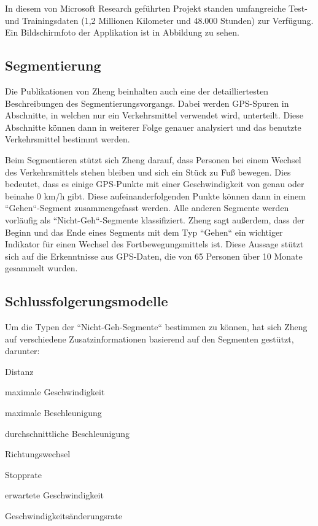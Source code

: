 In diesem von Microsoft Research geführten Projekt standen umfangreiche Test- und Trainingsdaten (1,2 Millionen Kilometer und 48.000 Stunden) zur Verfügung. \cite{microsoft_research_geolife_2015} Ein Bildschirmfoto der Applikation ist in Abbildung  zu sehen. 


\subsection{Segmentierung}
Die Publikationen von Zheng beinhalten auch eine der detailliertesten Beschreibungen des Segmentierungsvorgangs. Dabei werden GPS-Spuren in Abschnitte, in welchen nur ein Verkehrsmittel verwendet wird, unterteilt. Diese Abschnitte können dann in weiterer Folge genauer analysiert und das benutzte Verkehrsmittel bestimmt werden.

Beim Segmentieren stützt sich Zheng darauf, dass Personen bei einem Wechsel des Verkehrsmittels stehen bleiben und sich ein Stück zu Fuß bewegen. Dies bedeutet, dass es einige GPS-Punkte mit einer Geschwindigkeit von genau oder beinahe 0 km/h gibt. Diese aufeinanderfolgenden Punkte können dann in einem ``Gehen``-Segment zusammengefasst werden. Alle anderen Segmente werden vorläufig als ``Nicht-Geh``-Segmente klassifiziert. Zheng sagt außerdem, dass der Beginn und das Ende eines Segments mit dem Typ ``Gehen`` ein wichtiger Indikator für einen Wechsel des Fortbewegungsmittels ist. Diese Aussage stützt sich auf die Erkenntnisse aus GPS-Daten, die von 65 Personen über 10 Monate gesammelt wurden.

\subsection{Schlussfolgerungsmodelle} \label{schlussfolgerungsmodelle}
Um die Typen der ``Nicht-Geh-Segmente`` bestimmen zu können, hat sich Zheng auf verschiedene Zusatzinformationen basierend auf den Segmenten gestützt, darunter:

\begin{pitemize}
\item Distanz
\item maximale Geschwindigkeit
\item maximale Beschleunigung
\item durchschnittliche Beschleunigung
\item Richtungswechsel
\item Stopprate
\item erwartete Geschwindigkeit
\item Geschwindigkeitsänderungsrate
\end{pitemize}

